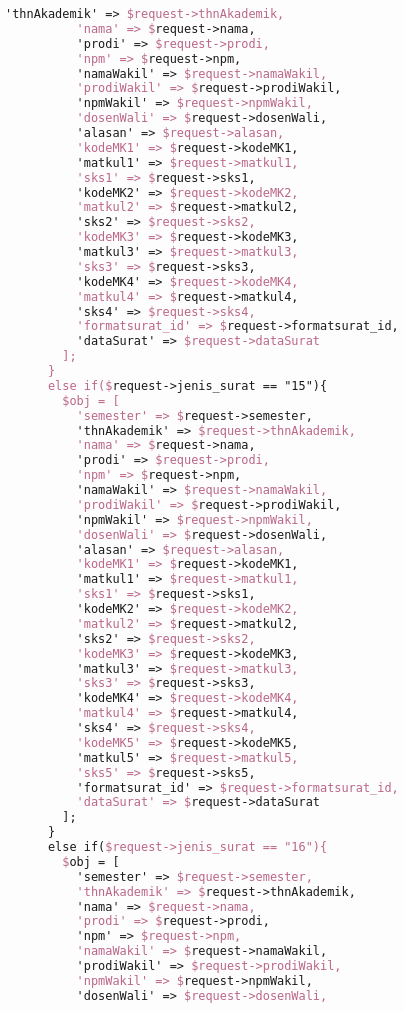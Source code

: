\begin{lstlisting}[language=tex,basicstyle=\tiny,caption=PesanansuratController.php]
          'thnAkademik' => $request->thnAkademik,
          'nama' => $request->nama,
          'prodi' => $request->prodi,
          'npm' => $request->npm,
          'namaWakil' => $request->namaWakil,
          'prodiWakil' => $request->prodiWakil,
          'npmWakil' => $request->npmWakil,
          'dosenWali' => $request->dosenWali,
          'alasan' => $request->alasan,
          'kodeMK1' => $request->kodeMK1,
          'matkul1' => $request->matkul1,
          'sks1' => $request->sks1,
          'kodeMK2' => $request->kodeMK2,
          'matkul2' => $request->matkul2,
          'sks2' => $request->sks2,
          'kodeMK3' => $request->kodeMK3,
          'matkul3' => $request->matkul3,
          'sks3' => $request->sks3,
          'kodeMK4' => $request->kodeMK4,
          'matkul4' => $request->matkul4,
          'sks4' => $request->sks4,
          'formatsurat_id' => $request->formatsurat_id,
          'dataSurat' => $request->dataSurat
        ];
      }
      else if($request->jenis_surat == "15"){
        $obj = [
          'semester' => $request->semester,
          'thnAkademik' => $request->thnAkademik,
          'nama' => $request->nama,
          'prodi' => $request->prodi,
          'npm' => $request->npm,
          'namaWakil' => $request->namaWakil,
          'prodiWakil' => $request->prodiWakil,
          'npmWakil' => $request->npmWakil,
          'dosenWali' => $request->dosenWali,
          'alasan' => $request->alasan,
          'kodeMK1' => $request->kodeMK1,
          'matkul1' => $request->matkul1,
          'sks1' => $request->sks1,
          'kodeMK2' => $request->kodeMK2,
          'matkul2' => $request->matkul2,
          'sks2' => $request->sks2,
          'kodeMK3' => $request->kodeMK3,
          'matkul3' => $request->matkul3,
          'sks3' => $request->sks3,
          'kodeMK4' => $request->kodeMK4,
          'matkul4' => $request->matkul4,
          'sks4' => $request->sks4,
          'kodeMK5' => $request->kodeMK5,
          'matkul5' => $request->matkul5,
          'sks5' => $request->sks5,
          'formatsurat_id' => $request->formatsurat_id,
          'dataSurat' => $request->dataSurat
        ];
      }
      else if($request->jenis_surat == "16"){
        $obj = [
          'semester' => $request->semester,
          'thnAkademik' => $request->thnAkademik,
          'nama' => $request->nama,
          'prodi' => $request->prodi,
          'npm' => $request->npm,
          'namaWakil' => $request->namaWakil,
          'prodiWakil' => $request->prodiWakil,
          'npmWakil' => $request->npmWakil,
          'dosenWali' => $request->dosenWali,

\end{lstlisting}
